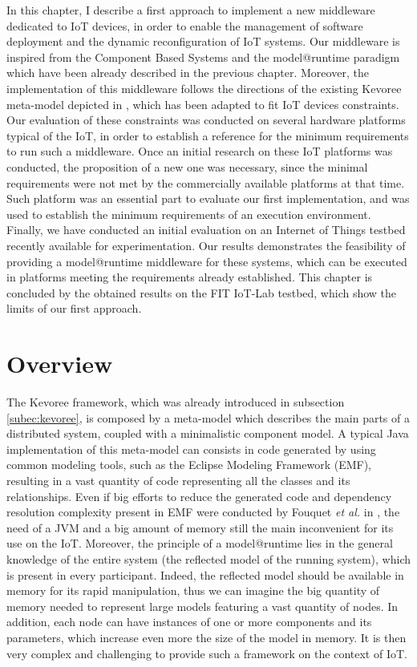 In this chapter, I describe a first approach to implement a new middleware dedicated to IoT devices, in order to enable the management of software deployment and the dynamic reconfiguration of IoT systems.
Our middleware is inspired from the Component Based Systems and the model@runtime paradigm which have been already described in the previous chapter.
Moreover, the implementation of this middleware follows the directions of the existing Kevoree meta-model depicted in , which has been adapted to fit IoT devices constraints. 
Our evaluation of these constraints was conducted on several hardware platforms typical of the IoT, in order to establish a reference for the minimum requirements to run such a middleware.
Once an initial research on these IoT platforms was conducted, the proposition of a new one was necessary, since the minimal requirements were not met by the commercially available platforms at that time.
Such platform was an essential part to evaluate our first implementation, and was used to establish the minimum requirements of an execution environment.
Finally, we have conducted an initial evaluation on an Internet of Things testbed\cite{Fleury15iotlab} recently available for experimentation.
Our results demonstrates the feasibility of providing a model@runtime middleware for these systems, which can be executed in platforms meeting the requirements already established.
This chapter is concluded by the obtained results on the FIT IoT-Lab testbed, which show the limits of our first approach.

\section{Overview}
\label{sec:MAR_overview}
The Kevoree framework, which was already introduced in subsection \ref{subec:kevoree}, is composed by a meta-model which describes the main parts of a distributed system, coupled with a minimalistic component model.
A typical Java implementation of this meta-model can consists in code generated by using common modeling tools, such as the Eclipse Modeling Framework (EMF)\cite{steinberg2008emf}, resulting in a vast quantity of code representing all the classes and its relationships.
Even if big efforts to reduce the generated code and dependency resolution complexity present in EMF were conducted by Fouquet \textit{et al.} in \cite{fouquet2012eclipse}, the need of a JVM and a big amount of memory still the main inconvenient for its use on the IoT.
Moreover, the principle of a model@runtime lies in the general knowledge of the entire system (the reflected model of the running system), which is present in every participant.
Indeed, the reflected model should be available in memory for its rapid manipulation, thus we can imagine the big quantity of memory needed to represent large models featuring a vast quantity of nodes.
In addition, each node can have instances of one or more components and its parameters, which increase even more the size of the model in memory.
It is then very complex and challenging to provide such a framework on the context of IoT.

